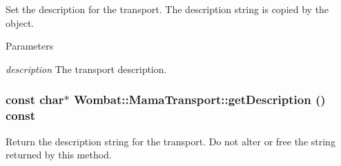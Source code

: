 Set the description for the transport. The description string is copied by the object.


\begin{DoxyParams}{Parameters}
\item[{\em description}]The transport description. \end{DoxyParams}
\hypertarget{classWombat_1_1MamaTransport_ad3f2a64e9c98f5c5562aa58cd93f0529}{
\subsubsection[{getDescription}]{\setlength{\rightskip}{0pt plus 5cm}const char$\ast$ Wombat::MamaTransport::getDescription () const}}
\label{classWombat_1_1MamaTransport_ad3f2a64e9c98f5c5562aa58cd93f0529}


Return the description string for the transport. Do not alter or free the string returned by this method.


